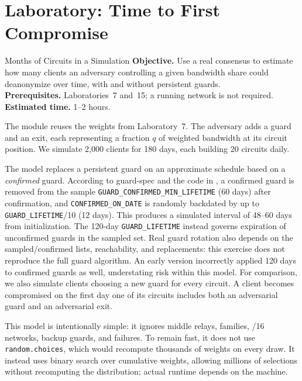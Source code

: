 \section{Laboratory: Time to First Compromise}\label{sec:lab-ricerca}

\begin{laboratorio}[19]{Months of Circuits in a Simulation}
\textbf{Objective.} Use a real consensus to estimate how many clients an adversary controlling a given bandwidth share could deanonymize over time, with and without persistent guards.\\
\textbf{Prerequisites.} Laboratories~7 and~15; a running network is not required.\\
\textbf{Estimated time.} 1--2 hours.
\end{laboratorio}

The  module reuses the weights from Laboratory~7. The adversary adds a guard and an exit, each representing a fraction $q$ of weighted bandwidth at its circuit position. We simulate 2,000 clients for 180 days, each building 20 circuits daily.

The model replaces a persistent guard on an approximate schedule based on a \emph{confirmed} guard. According to guard-spec and the code in , a confirmed guard is removed from the sample \texttt{GUARD\_CONFIRMED\_MIN\_LIFETIME} (60 days) after confirmation, and \texttt{CONFIRMED\_ON\_DATE} is randomly backdated by up to \texttt{GUARD\_LIFETIME}/10 (12 days). This produces a simulated interval of 48--60 days from initialization. The 120-day \texttt{GUARD\_LIFETIME} instead governs expiration of unconfirmed guards in the sampled set. Real guard rotation also depends on the sampled/confirmed lists, reachability, and replacements: this exercise does not reproduce the full guard algorithm. An early version incorrectly applied 120 days to confirmed guards as well, understating risk within this model. For comparison, we also simulate clients choosing a new guard for every circuit. A client becomes compromised on the first day one of its circuits includes both an adversarial guard and an adversarial exit.

This model is intentionally simple: it ignores middle relays, families, /16 networks, backup guards, and failures. To remain fast, it does not use \texttt{random.choices}, which would recompute thousands of weights on every draw. It instead uses binary search over cumulative weights, allowing millions of selections without recomputing the distribution; actual runtime depends on the machine.

